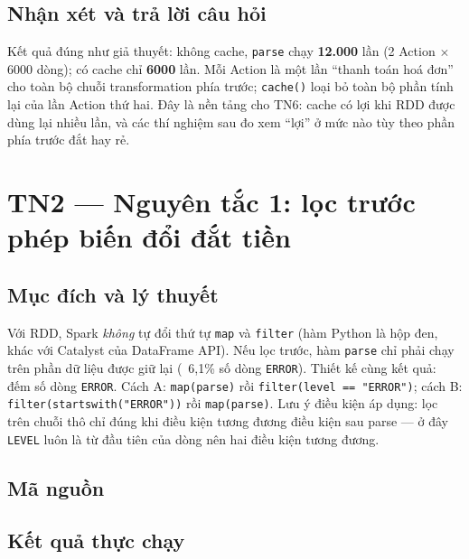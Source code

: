 \documentclass[12pt,a4paper,oneside]{article}
\begin{document}
\subsection{Nhận xét và trả lời câu hỏi}

Kết quả đúng như giả thuyết: không cache, \texttt{parse} chạy \textbf{12.000} lần (2 Action $\times$ 6000 dòng); có cache chỉ \textbf{6000} lần. Mỗi Action là một lần ``thanh toán hoá đơn'' cho toàn bộ chuỗi transformation phía trước; \texttt{cache()} loại bỏ toàn bộ phần tính lại của lần Action thứ hai. Đây là nền tảng cho TN6: cache có lợi khi RDD được dùng lại nhiều lần, và các thí nghiệm sau đo xem ``lợi'' ở mức nào tùy theo phần phía trước đắt hay rẻ.

\section{TN2 --- Nguyên tắc 1: lọc trước phép biến đổi đắt tiền}
\label{sec:tn2}

\subsection{Mục đích và lý thuyết}

Với RDD, Spark \emph{không} tự đổi thứ tự \texttt{map} và \texttt{filter} (hàm Python là hộp đen, khác với Catalyst của DataFrame API). Nếu lọc trước, hàm \texttt{parse} chỉ phải chạy trên phần dữ liệu được giữ lại (~6,1\% số dòng \texttt{ERROR}). Thiết kế cùng kết quả: đếm số dòng \texttt{ERROR}. Cách A: \texttt{map(parse)} rồi \texttt{filter(level == "ERROR")}; cách B: \texttt{filter(startswith("ERROR"))} rồi \texttt{map(parse)}. Lưu ý điều kiện áp dụng: lọc trên chuỗi thô chỉ đúng khi điều kiện tương đương điều kiện sau parse --- ở đây \texttt{LEVEL} luôn là từ đầu tiên của dòng nên hai điều kiện tương đương.

\subsection{Mã nguồn}



\subsection{Kết quả thực chạy}
\end{document}
